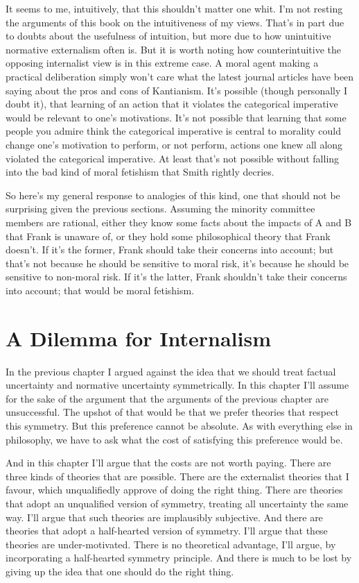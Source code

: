\documentclass[
  10pt,
  letterpaper,
  twoside]{scrbook}
\begin{document}
It seems to me, intuitively, that this shouldn't matter one whit. I'm
not resting the arguments of this book on the intuitiveness of my views.
That's in part due to doubts about the usefulness of intuition, but more
due to how unintuitive normative externalism often is. But it is worth
noting how counterintuitive the opposing internalist view is in this
extreme case. A moral agent making a practical deliberation simply won't
care what the latest journal articles have been saying about the pros
and cons of Kantianism. It's possible (though personally I doubt it),
that learning of an action that it violates the categorical imperative
would be relevant to one's motivations. It's not possible that learning
that some people you admire think the categorical imperative is central
to morality could change one's motivation to perform, or not perform,
actions one knew all along violated the categorical imperative. At least
that's not possible without falling into the bad kind of moral fetishism
that Smith rightly decries.

So here's my general response to analogies of this kind, one that should
not be surprising given the previous sections. Assuming the minority
committee members are rational, either they know some facts about the
impacts of A and B that {Frank} is unaware of, or they hold some
philosophical theory that {Frank} doesn't. If it's the former, {Frank}
should take their concerns into account; but that's not because he
should be sensitive to moral risk, it's because he should be sensitive
to non-moral risk. If it's the latter, {Frank} shouldn't take their
concerns into account; that would be moral fetishism.

\chapter{A Dilemma for Internalism}\label{adilemmaforinternalism}

In the previous chapter I argued against the idea that we should treat
factual uncertainty and normative uncertainty symmetrically. In this
chapter I'll assume for the sake of the argument that the arguments of
the previous chapter are unsuccessful. The upshot of that would be that
we prefer theories that respect this symmetry. But this preference
cannot be absolute. As with everything else in philosophy, we have to
ask what the cost of satisfying this preference would be.

And in this chapter I'll argue that the costs are not worth paying.
There are three kinds of theories that are possible. There are the
externalist theories that I favour, which unqualifiedly approve of doing
the right thing. There are theories that adopt an unqualified version of
symmetry, treating all uncertainty the same way. I'll argue that such
theories are implausibly subjective. And there are theories that adopt a
half-hearted version of symmetry. I'll argue that these theories are
under-motivated. There is no theoretical advantage, I'll argue, by
incorporating a half-hearted symmetry principle. And there is much to be
lost by giving up the idea that one should do the right thing.
\end{document}

